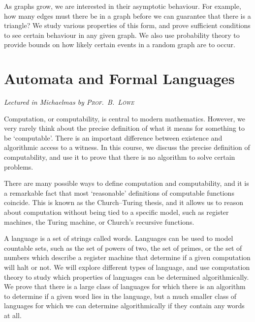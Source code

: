 As graphs grow, we are interested in their asymptotic behaviour.
For example, how many edges must there be in a graph before we can guarantee that there is a triangle?
We study various properties of this form, and prove sufficient conditions to see certain behaviour in any given graph.
We also use probability theory to provide bounds on how likely certain events in a random graph are to occur.



\chapter[Automata and Formal Languages \\ \textnormal{\emph{Lectured in Michaelmas \oldstylenums{2022} by \textsc{Prof.\ B.\ L\"owe}}}]{Automata and Formal Languages}
\emph{\Large Lectured in Michaelmas  by \textsc{Prof.\ B.\ L\"owe}}

Computation, or computability, is central to modern mathematics.
However, we very rarely think about the precise definition of what it means for something to be `computable'.
There is an important difference between existence and algorithmic access to a witness.
In this course, we discuss the precise definition of computability, and use it to prove that there is no algorithm to solve certain problems.

There are many possible ways to define computation and computability, and it is a remarkable fact that most `reasonable' definitions of computable functions coincide.
This is known as the Church--Turing thesis, and it allows us to reason about computation without being tied to a specific model, such as register machines, the Turing machine, or Church's recursive functions.

A language is a set of strings called words.
Languages can be used to model countable sets, such as the set of powers of two, the set of primes, or the set of numbers which describe a register machine that determine if a given computation will halt or not.
We will explore different types of language, and use computation theory to study which properties of languages can be determined algorithmically.
We prove that there is a large class of languages for which there is an algorithm to determine if a given word lies in the language, but a much smaller class of languages for which we can determine algorithmically if they contain any words at all.



